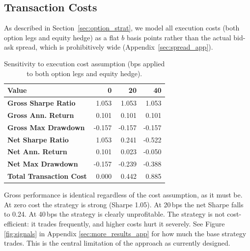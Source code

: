 \documentclass[12pt, a4paper]{article}
\begin{document}
\subsection{Transaction Costs}

As described in Section~\ref{sec:option_strat}, we model all execution costs (both option legs and equity hedge) as a flat $b$ basis points rather than the actual bid-ask spread, which is prohibitively wide (Appendix~\ref{sec:spread_app}).

\begin{table}[h]
\centering
\caption{Sensitivity to execution cost assumption (bps applied to both option legs and equity hedge).}
\label{tab:txn_cost_bps_sens}
\begin{tabular}{lrrr}
\toprule
Value & 0 & 20 & 40 \\
\midrule
\textbf{Gross Sharpe Ratio} & 1.053 & 1.053 & 1.053 \\
\textbf{Gross Ann. Return} & 0.101 & 0.101 & 0.101 \\
\textbf{Gross Max Drawdown} & -0.157 & -0.157 & -0.157 \\
\textbf{Net Sharpe Ratio} & 1.053 & 0.241 & -0.522 \\
\textbf{Net Ann. Return} & 0.101 & 0.023 & -0.050 \\
\textbf{Net Max Drawdown} & -0.157 & -0.239 & -0.388 \\
\textbf{Total Transaction Cost} & 0.000 & 0.442 & 0.885 \\
\bottomrule
\end{tabular}
\end{table}

Gross performance is identical regardless of the cost assumption, as it must be. At zero cost the strategy is strong (Sharpe 1.05). At 20\,bps the net Sharpe falls to 0.24. At 40\,bps the strategy is clearly unprofitable. The strategy is not cost-efficient: it trades frequently, and higher costs hurt it severely. See Figure \ref{fig:signals} in Appendix \ref{sec:more_results_app} for how much the base strategy trades. This is the central limitation of the approach as currently designed.
\end{document}
